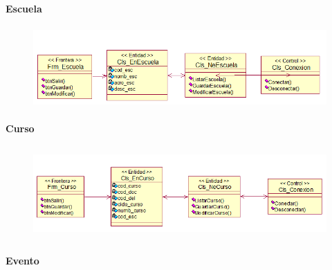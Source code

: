 \documentclass[12pt]{report}
\begin{document}
\begin{itemize}
{\fontsize{10pt}{12.0pt}\selectfont \textbf{Escuela}\par}\par




\begin{figure}[H]
	\begin{Center}
		\includegraphics[width=6.33in,height=1.26in]{./media/image13.png}
	\end{Center}
\end{figure}



\par

{\fontsize{10pt}{12.0pt}\selectfont \textbf{Curso}\par}\par




\begin{figure}[H]
	\begin{Center}
		\includegraphics[width=6.33in,height=1.44in]{./media/image14.png}
	\end{Center}
\end{figure}



\par


\vspace{\baselineskip}

\vspace{\baselineskip}
{\fontsize{10pt}{12.0pt}\selectfont \textbf{Evento}\par}\par




\end{itemize}
\end{document}
